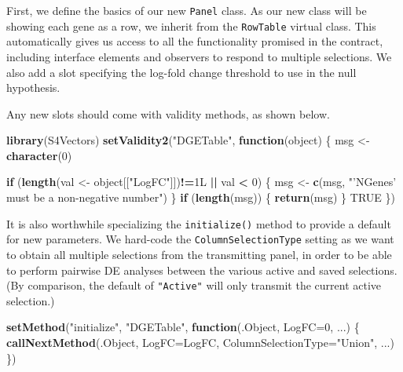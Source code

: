 \documentclass[
]{book}
\newenvironment{Shaded}{\begin{snugshade}}{\end{snugshade}}
\newcommand{\ControlFlowTok}[1]{\textcolor[rgb]{0.13,0.29,0.53}{\textbf{#1}}}
\newcommand{\DataTypeTok}[1]{\textcolor[rgb]{0.13,0.29,0.53}{#1}}
\newcommand{\DecValTok}[1]{\textcolor[rgb]{0.00,0.00,0.81}{#1}}
\newcommand{\KeywordTok}[1]{\textcolor[rgb]{0.13,0.29,0.53}{\textbf{#1}}}
\newcommand{\NormalTok}[1]{#1}
\newcommand{\OperatorTok}[1]{\textcolor[rgb]{0.81,0.36,0.00}{\textbf{#1}}}
\newcommand{\OtherTok}[1]{\textcolor[rgb]{0.56,0.35,0.01}{#1}}
\newcommand{\StringTok}[1]{\textcolor[rgb]{0.31,0.60,0.02}{#1}}
\begin{document}
First, we define the basics of our new \texttt{Panel} class.
As our new class will be showing each gene as a row, we inherit from the \texttt{RowTable} virtual class.
This automatically gives us access to all the functionality promised in the contract,
including interface elements and observers to respond to multiple selections.
We also add a slot specifying the log-fold change threshold to use in the null hypothesis.

Any new slots should come with validity methods, as shown below.

\begin{Shaded}
\begin{Highlighting}[]
\KeywordTok{library}\NormalTok{(S4Vectors)}
\KeywordTok{setValidity2}\NormalTok{(}\StringTok{"DGETable"}\NormalTok{, }\ControlFlowTok{function}\NormalTok{(object) \{}
\NormalTok{    msg <-}\StringTok{ }\KeywordTok{character}\NormalTok{(}\DecValTok{0}\NormalTok{)}

    \ControlFlowTok{if}\NormalTok{ (}\KeywordTok{length}\NormalTok{(val <-}\StringTok{ }\NormalTok{object[[}\StringTok{"LogFC"}\NormalTok{]])}\OperatorTok{!=}\NormalTok{1L }\OperatorTok{||}\StringTok{ }\NormalTok{val }\OperatorTok{<}\StringTok{ }\DecValTok{0}\NormalTok{) \{}
\NormalTok{        msg <-}\StringTok{ }\KeywordTok{c}\NormalTok{(msg, }\StringTok{"'NGenes' must be a non-negative number"}\NormalTok{)}
\NormalTok{    \}}
    \ControlFlowTok{if}\NormalTok{ (}\KeywordTok{length}\NormalTok{(msg)) \{}
        \KeywordTok{return}\NormalTok{(msg)}
\NormalTok{    \}}
    \OtherTok{TRUE}
\NormalTok{\})}
\end{Highlighting}
\end{Shaded}

It is also worthwhile specializing the \texttt{initialize()} method to provide a default for new parameters.
We hard-code the \texttt{ColumnSelectionType} setting as we want to obtain all multiple selections from the transmitting panel,
in order to be able to perform pairwise DE analyses between the various active and saved selections.
(By comparison, the default of \texttt{"Active"} will only transmit the current active selection.)

\begin{Shaded}
\begin{Highlighting}[]
\KeywordTok{setMethod}\NormalTok{(}\StringTok{"initialize"}\NormalTok{, }\StringTok{"DGETable"}\NormalTok{, }
    \ControlFlowTok{function}\NormalTok{(.Object, }\DataTypeTok{LogFC=}\DecValTok{0}\NormalTok{, ...) }
\NormalTok{\{}
    \KeywordTok{callNextMethod}\NormalTok{(.Object, }\DataTypeTok{LogFC=}\NormalTok{LogFC, }\DataTypeTok{ColumnSelectionType=}\StringTok{"Union"}\NormalTok{, ...)}
\NormalTok{\})}
\end{Highlighting}
\end{Shaded}
\end{document}

